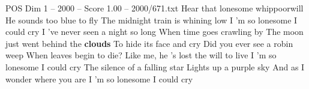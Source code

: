 \begin{textsample}{POS Dim 1 – 2000 – Score 1.00 – 2000/671.txt}  \label{ex:f1_pos_033}
Hear that lonesome whippoorwill He sounds too blue to fly The midnight train is whining low I 'm so lonesome I could cry I 've never seen a night so long When time goes crawling by The moon just went behind the \textbf{clouds} To hide its face and cry Did you ever see a robin weep When leaves begin to die?
Like me, he 's lost the will to live I 'm so lonesome I could cry The silence of a falling star Lights up a purple sky And as I wonder where you are I 'm so lonesome I could cry

\end{textsample}
